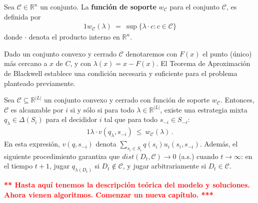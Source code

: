 \begin{definition}
\label{def:funcion-soporte}
Sea $\mathcal{C} \in \mathbb{R}^n$ un conjunto. La \textbf{función de soporte} $w_{\mathcal{C}}$ para el conjunto $\mathcal{C}$, es definida por
\begin{alignat}{1}
	w_{\mathcal{C}}(\lambda)\ =\ \sup\{\lambda \cdot c : c \in \mathcal{C} \}
\end{alignat}
donde $\cdot$ denota el producto interno en $\mathbb{R}^n$.
\end{definition}

Dado un conjunto convexo y cerrado $\mathcal{C}$ denotaremos con $F(x)$ el punto (único) más cercano a $x$ de $C$, y con $\lambda(x)= x - F(x)$.
El Teorema de Aproximación de Blackwell establece una condición necesaria y suficiente para el problema planteado previamente.

\begin{theorem}
\label{theo:blackwell}
Sea $\mathcal{C} \subseteq \mathbb{R}^{|L|}$ un conjunto convexo y cerrado con función de soporte $w_{\mathcal{C}}$. Entonces, $\mathcal{C}$ es alcanzable por $i$ si y sólo si para todo $\lambda \in \mathbb{R}^{|L|}$, existe una estrategia mixta $q_{\lambda} \in \Delta(S_i)$ para el decididor $i$ tal que para todo $s_{-i}\in S_{-i}$:
\begin{alignat}{1}
  \lambda \cdot v(q_{\lambda}, s_{-i})\ \leq\ w_{\mathcal{C}}(\lambda) \,.
\end{alignat}
En esta expresión, $v(q, s_{-i})$ denota $\sum_{s_i \in S_i} q(s_i)u_i(s_i, s_{-i})$. 
Además, el siguiente procedimiento garantiza que $dist(D_t, \mathcal{C}) \rightarrow 0$ (a.s.) cuando $t \rightarrow \infty$: en el tiempo $t+1$, jugar $q_{\lambda(D_t)}$ si $D_t \notin \mathcal{C}$, y jugar arbitrariamente si $D_t \in \mathcal{C}$.
\end{theorem}


\noindent\textcolor{red}{\bf *** Hasta aquí tenemos la descripción teórica del modelo y soluciones. Ahora vienen algoritmos. Comenzar un nueva capítulo. ***}
